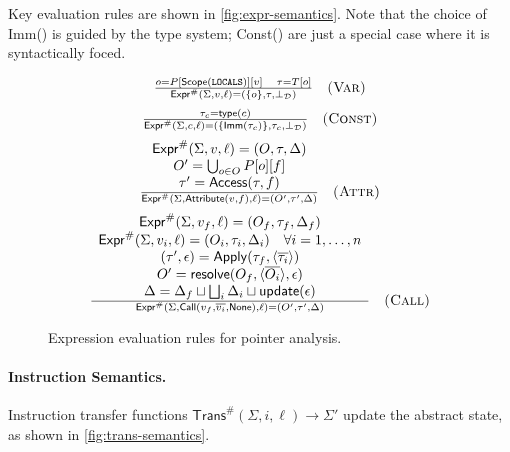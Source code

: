 Key evaluation rules are shown in \autoref{fig:expr-semantics}. Note that the choice of Imm() is guided by the type system; Const() are just a special case where it is syntactically foced. 

\begin{figure}[t]
\centering
\[
\begin{array}{c}
\frac{
  o = P[\mathsf{Scope}(\mathtt{LOCALS})][v]
  \quad \tau = T[o]
}{
  \mathsf{Expr}^\#(\Sigma, v, \ell) = (\{o\}, \tau, \bot_\mathcal{D})
} \quad \textsc{(Var)}
\\[2ex]
\frac{
  \tau_c = \mathsf{type}(c)
}{
  \mathsf{Expr}^\#(\Sigma, c, \ell) = (\{\mathsf{Imm}(\tau_c)\}, \tau_c, \bot_\mathcal{D})
} \quad \textsc{(Const)}
\\[2ex]
\frac{
  \begin{array}{c}
    \mathsf{Expr}^\#(\Sigma, v, \ell) = (O,\tau,\Delta) \\
    O' = \bigcup_{o\in O} P[o][f] \\
    \tau' = \mathsf{Access}(\tau,f)
  \end{array}
}{
  \mathsf{Expr}^\#(\Sigma, \mathsf{Attribute}(v,f), \ell)
    = (O',\tau',\Delta)
} \quad \textsc{(Attr)}
\\[2ex]
\frac{
  \begin{array}{c}
    \mathsf{Expr}^\#(\Sigma,v_f,\ell) = (O_f,\tau_f,\Delta_f) \\
    \mathsf{Expr}^\#(\Sigma,v_i,\ell) = (O_i,\tau_i,\Delta_i)\quad\forall i=1,\dots,n \\
    (\tau',\epsilon) = \mathsf{Apply}(\tau_f,\langle\overline{\tau_i}\rangle) \\
    O' = \mathsf{resolve}(O_f,\langle\overline{O_i}\rangle,\epsilon) \\
    \Delta = \Delta_f \sqcup \bigsqcup_i \Delta_i \sqcup \mathsf{update}(\epsilon)
  \end{array}
}{
  \mathsf{Expr}^\#(\Sigma,\mathsf{Call}(v_f,\overline{v_i},\mathsf{None}),\ell)
    = (O',\tau',\Delta)
} \quad \textsc{(Call)}
\end{array}
\]
\caption{Expression evaluation rules for pointer analysis.}
\label{fig:expr-semantics}
\end{figure}

\paragraph{Instruction Semantics.}
Instruction transfer functions $\mathsf{Trans}^\#(\Sigma,i,\ell) \to \Sigma'$ update the abstract state, as shown in \autoref{fig:trans-semantics}.

